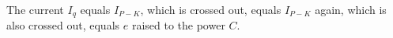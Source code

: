 The current \( I_q \) equals \( I_{P-K} \), which is crossed out, equals \( I_{P-K} \) again, which is also crossed out, equals \( e \) raised to the power \( C \).